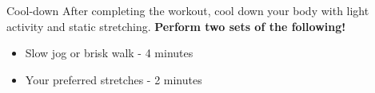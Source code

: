 \documentclass{article}
\newcounter{workout}
\begin{document}
\begin{tcolorbox}[colback=gray!15,colframe=black,enforce breakable,pad at break*=5mm,boxrule=0.5mm]
		\begin{workoutbox}{Cool-down}
			After completing the workout, cool down your body with light activity and static stretching. \textbf{Perform two sets of the following!}
			
			\begin{itemize}[label=\textcolor{blue!70}{\textbullet}, itemsep=0pt]
				\item Slow jog or brisk walk - 4 minutes
				\item Your preferred stretches - 2 minutes
			\end{itemize}
		\end{workoutbox}
		
	\end{tcolorbox}
	
\end{document}
